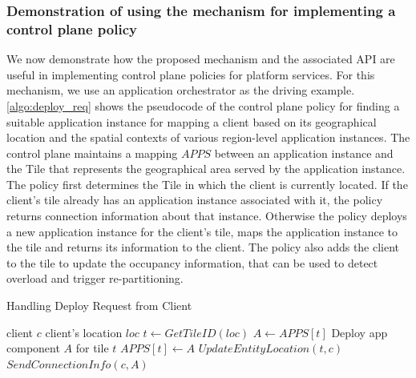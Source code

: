 \subsubsection{Demonstration of using the mechanism for implementing a control plane policy}
We now demonstrate how the proposed mechanism and the associated API are useful in implementing control plane policies for platform services. For this mechanism, we use an application orchestrator as the driving example. \cref{algo:deploy_req} shows the pseudocode of the control plane policy for finding a suitable application instance for mapping a client based on its geographical location and the spatial contexts of various region-level application instances. The control plane maintains a mapping $APPS$ between an application instance and the Tile that represents the geographical area served by the application instance. The policy first determines the Tile in which the client is currently located. If the client's tile already has an application instance associated with it, the policy returns connection information about that instance. Otherwise the policy deploys a new application instance for the client's tile, maps the application instance to the tile and returns its information to the client. The policy also adds the client to the tile to update the occupancy information, that can be used to detect overload and trigger re-partitioning.
\begin{algorithm}
\caption{Handling Deploy Request from Client}
\begin{algorithmic}
\Require client $c$
\Require client's location $loc$
\State $t \gets GetTileID \left( loc \right)$
    \State $A \gets APPS \left[ t \right]$
\Else
    \State Deploy app component $A$ for tile $t$
    \State $APPS  \left[ t \right] \gets A$
\EndIf
\State $UpdateEntityLocation \left(t, c \right)$
\State $SendConnectionInfo \left(c, A \right)$ 
\end{algorithmic}
\label{algo:deploy_req}
\end{algorithm}

